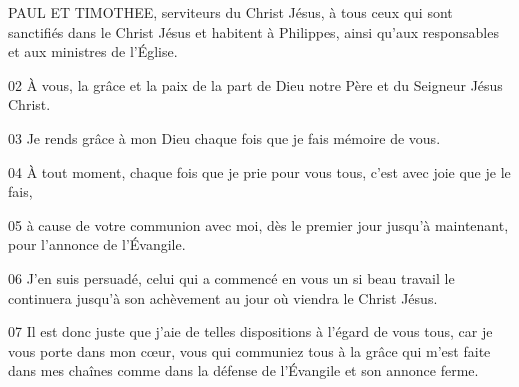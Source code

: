 PAUL ET TIMOTHEE, serviteurs du Christ Jésus, à tous ceux qui sont sanctifiés dans le Christ Jésus et habitent à Philippes, ainsi qu’aux responsables et aux ministres de l’Église.

02 À vous, la grâce et la paix de la part de Dieu notre Père et du Seigneur Jésus Christ.

03 Je rends grâce à mon Dieu chaque fois que je fais mémoire de vous.

04 À tout moment, chaque fois que je prie pour vous tous, c’est avec joie que je le fais,

05 à cause de votre communion avec moi, dès le premier jour jusqu’à maintenant, pour l’annonce de l’Évangile.

06 J’en suis persuadé, celui qui a commencé en vous un si beau travail le continuera jusqu’à son achèvement au jour où viendra le Christ Jésus.

07 Il est donc juste que j’aie de telles dispositions à l’égard de vous tous, car je vous porte dans mon cœur, vous qui communiez tous à la grâce qui m’est faite dans mes chaînes comme dans la défense de l’Évangile et son annonce ferme.

